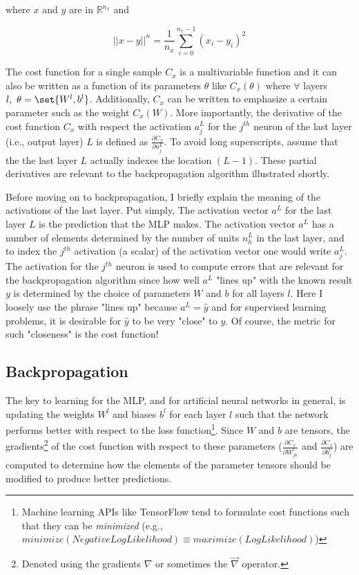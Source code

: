 \documentclass{article}
\DeclarePairedDelimiter\set\{\}
\begin{document}
where $x$ and $y$ are in $\mathbb{R}^{n_x}$ and

\begin{equation}
	||x - y||^{n} = \frac{1}{n_x} \sum_{i=0}^{n_{x}-1} { (x_{i} - y_{i})^{2} }
\end{equation}

The cost function for a single sample $C_x$ is a multivariable function
and it can also be written as a function of its parameters $\theta$ like
$C_x(\theta)$ where $\forall$ layers $l,\ \theta = \set{W^{l}, b^{l}}$. Additionally,
$C_x$ can be written to emphasize a certain parameter such as the weight $C_x(W)$.
More importantly, the derivative of the cost function $C_x$ with respect the activation
$a_j^{L}$ for the $j^{th}$ neuron of the last layer (i.e., output layer) $L$ is defined as
$\frac{\partial C_x}{\partial a_j^{L}}$. To avoid long superscripts, assume
that the the last layer $L$ actually indexes the location $(L-1)$.
These partial derivatives are relevant to the backpropagation algorithm illustrated shortly.

Before moving on to backpropagation, I briefly explain the meaning of the activations
of the last layer. Put simply, The activation vector $a^{L}$ for the last layer $L$ is the prediction
that the MLP makes. The activation vector $a^{L}$ has a number of elements
determined by the number of units $n_h^{L}$ in the last layer, and to index the $j^{th}$
activation (a scalar) of the activation vector one would write $a_j^{L}$. The activation for
the $j^{th}$ neuron is used to compute errors that are relevant for the
backpropagation algorithm since how well $a^{L}$ "lines up" with the known
result $y$ is determined by the choice of parameters $W$ and $b$ for all layers $l$.
Here I loosely use the phrase "lines up" because $a^{L} = \hat{y}$ and for supervised
learning problems, it is desirable for $\hat{y}$ to be very "close" to $y$. Of
course, the metric for such "closeness" is the cost function!

\subsection{Backpropagation}

The key to learning for the MLP, and for artificial neural networks in general,
is updating the weights $W^{l}$ and biases $b^{l}$ for each layer $l$ such
that the network performs better with respect to the loss function\footnote{
Machine learning APIs like TensorFlow tend to formulate cost functions
such that they can be \textit{minimized} (e.g.,
$minimize(NegativeLogLikelihood) \equiv maximize(LogLikelihood)$)}.
Since $W$ and $b$ are tensors, the gradients\footnote{Denoted
	using the gradients $\nabla$ or sometimes the $\vec{\nabla}$ operator.}
of the cost function with respect to these parameters ($\frac{\partial C_x}{\partial W_{jk}^{l}}$
and $\frac{\partial C_x}{\partial b_{j}^{l}}$) are computed to determine how
the elements of the parameter tensors should be modified to produce better predictions.
\end{document}
